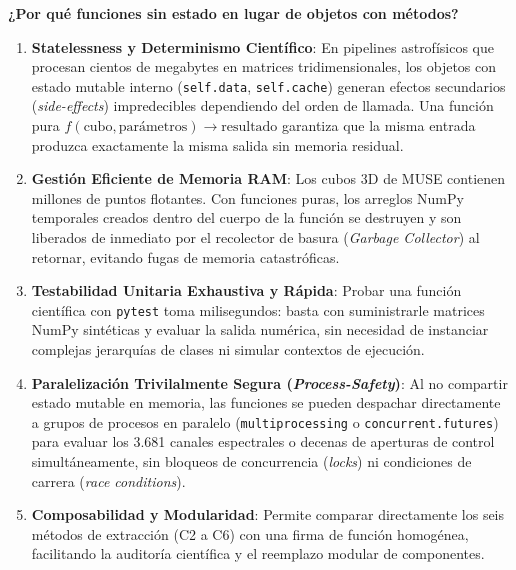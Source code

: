 \documentclass[11pt,a4paper]{article}
\begin{document}
\noindent\textbf{¿Por qué funciones sin estado en lugar de objetos con métodos?}
\begin{enumerate}[leftmargin=1.0cm]
    \item \textbf{Statelessness y Determinismo Científico}: En pipelines astrofísicos que procesan cientos de megabytes en matrices tridimensionales, los objetos con estado mutable interno (\texttt{self.data}, \texttt{self.cache}) generan efectos secundarios (\textit{side-effects}) impredecibles dependiendo del orden de llamada. Una función pura $f(\text{cubo}, \text{parámetros}) \rightarrow \text{resultado}$ garantiza que la misma entrada produzca exactamente la misma salida sin memoria residual.
    \item \textbf{Gestión Eficiente de Memoria RAM}: Los cubos 3D de MUSE contienen millones de puntos flotantes. Con funciones puras, los arreglos NumPy temporales creados dentro del cuerpo de la función se destruyen y son liberados de inmediato por el recolector de basura (\textit{Garbage Collector}) al retornar, evitando fugas de memoria catastróficas.
    \item \textbf{Testabilidad Unitaria Exhaustiva y Rápida}: Probar una función científica con \texttt{pytest} toma milisegundos: basta con suministrarle matrices NumPy sintéticas y evaluar la salida numérica, sin necesidad de instanciar complejas jerarquías de clases ni simular contextos de ejecución.
    \item \textbf{Paralelización Trivilalmente Segura (\textit{Process-Safety})}: Al no compartir estado mutable en memoria, las funciones se pueden despachar directamente a grupos de procesos en paralelo (\texttt{multiprocessing} o \texttt{concurrent.futures}) para evaluar los 3.681 canales espectrales o decenas de aperturas de control simultáneamente, sin bloqueos de concurrencia (\textit{locks}) ni condiciones de carrera (\textit{race conditions}).
    \item \textbf{Composabilidad y Modularidad}: Permite comparar directamente los seis métodos de extracción (C2 a C6) con una firma de función homogénea, facilitando la auditoría científica y el reemplazo modular de componentes.
\end{enumerate}
\end{document}
